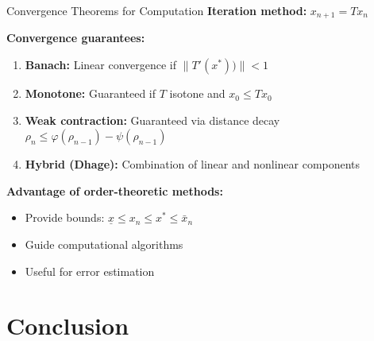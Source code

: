 \documentclass[aspectratio=169,10pt]{beamer}
\theoremstyle{plain}
\begin{document}
\begin{frame}{Convergence Theorems for Computation}
  \textbf{Iteration method:} $x_{n+1} = Tx_n$

  \vspace{1em}

  \textbf{Convergence guarantees:}
  \begin{enumerate}
    \item \textbf{Banach:} Linear convergence if $\|T'(x^*))\| < 1$
    \item \textbf{Monotone:} Guaranteed if $T$ isotone and $x_0 \leq Tx_0$
    \item \textbf{Weak contraction:} Guaranteed via distance decay $\rho_n \leq \varphi(\rho_{n-1}) - \psi(\rho_{n-1})$
    \item \textbf{Hybrid (Dhage):} Combination of linear and nonlinear components
  \end{enumerate}

  \vspace{1em}

  \textbf{Advantage of order-theoretic methods:}
  \begin{itemize}
    \item Provide bounds: $\underline{x} \leq x_n \leq x^* \leq \bar{x}_n$
    \item Guide computational algorithms
    \item Useful for error estimation
  \end{itemize}
\end{frame}

\section{Conclusion}
\end{document}
